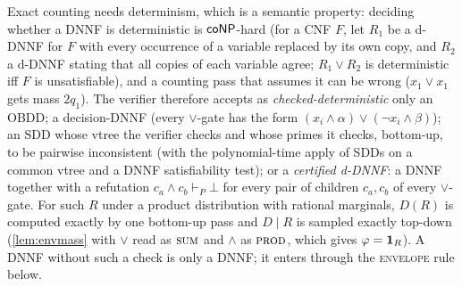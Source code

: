 Exact counting needs determinism, which is a semantic property: deciding
whether a DNNF is deterministic is $\mathsf{coNP}$-hard (for a CNF $F$, let $R_1$ be a
d-DNNF for $F$ with every occurrence of a variable replaced by its own copy, and
$R_2$ a d-DNNF stating that all copies of each variable agree; $R_1\vee R_2$ is
deterministic iff $F$ is unsatisfiable), and a counting pass that assumes it can be
wrong ($x_1\vee x_1$ gets mass $2q_1$). The verifier
therefore accepts as \emph{checked-deterministic} only an OBDD; a
decision-DNNF (every $\vee$-gate has the form $(x_i\wedge\alpha)\vee(\neg
x_i\wedge\beta)$); an SDD whose vtree the verifier checks and whose primes it
checks, bottom-up, to be pairwise inconsistent (with the polynomial-time apply
of SDDs on a common vtree and a DNNF satisfiability test); or a \emph{certified
d-DNNF}: a DNNF together with a refutation $c_a\wedge c_b\vdash_P\bot$ for
every pair of children $c_a,c_b$ of every $\vee$-gate. For such $R$ under a
product distribution with rational marginals, $D(R)$ is computed exactly by one
bottom-up pass and $D\mid R$ is sampled exactly top-down (\cref{lem:envmass}
with $\vee$ read as $\textsc{sum}$ and $\wedge$ as $\textsc{prod}$, which gives $\varphi=\mathbf{1}_R$).
A DNNF without such a check is only a DNNF; it enters through the
\textsc{envelope} rule below.

